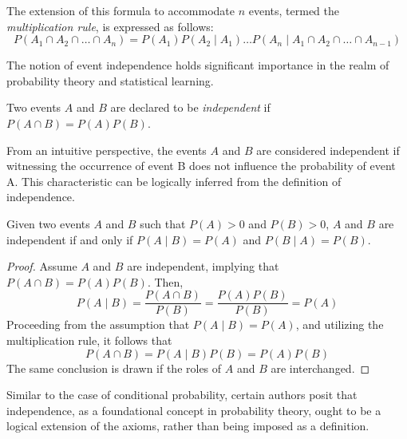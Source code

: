The extension of this formula to accommodate $n$ events, termed the \emph{multiplication rule}, is expressed as follows:
\begin{equation}\label{eq:multiplication_rule}
P \left( A_{1} \cap A_{2} \cap \ldots \cap A_{n} \right) = P \left( A_{1} \right) P \left( A_{2} \mid A_{1}\right) \ldots  P \left( A_{n} \mid A_{1}\cap A_{2} \cap \ldots \cap A_{n-1} \right)
\end{equation}

The notion of event independence holds significant importance in the realm of probability theory and statistical learning. 

\begin{definition}\label{independent_events}
Two events $A$ and $B$ are declared to be \emph{independent} if $P \left( A \cap B \right) = P \left( A \right) P \left(B \right)$.
\end{definition}

From an intuitive perspective, the events $A$ and $B$ are considered independent if witnessing the occurrence of event B does not influence the probability of event A. This characteristic can be logically inferred from the definition of independence.

\begin{proposition}
Given two events $A$ and $B$ such that $P \left( A \right) > 0$ and $P \left( B \right)>0$, $A$ and $B$ are independent if and only if $P \left( A \mid B\right) = P \left( A \right)$ and $P \left( B \mid  A \right) = P \left( B \right)$.
\end{proposition}
\begin{proof}
Assume $A$ and $B$ are independent, implying that $P \left( A \cap B \right) = P \left( A \right) P \left(B \right)$. Then,
\[
P \left( A \mid B \right) = \frac{P\left(A\cap B\right)}{P\left(B\right)} = \frac{P \left( A \right) P \left(B \right)}{P\left(B\right)} = P \left( A \right)
\]
Proceeding from the assumption that $P \left( A \mid B \right) = P \left( A \right)$, and utilizing the multiplication rule, it follows that
\[
P \left( A \cap B \right) =  P \left( A \mid B \right) P \left( B \right) = P \left( A \right) P \left( B \right)
\] 
The same conclusion is drawn if the roles of $A$ and $B$ are interchanged.
\end{proof}

Similar to the case of conditional probability, certain authors posit that independence, as a foundational concept in probability theory, ought to be a logical extension of the axioms, rather than being imposed as a definition.

